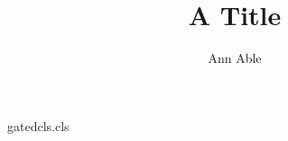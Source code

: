 \begin{filecontents*}[force]{gatedcls.cls}
\newcount\aucount
\def\author#1{\advance\aucount by 1 \gdef\@author{#1}}
\def\auaddress{}
\newcommand{\address}[1]{\g@addto@macro\auaddress{#1\par}}
\renewcommand\maketitle{\par{\@title\par}\ifnum\aucount>0 {\@author\par}{\auaddress}\fi}
\end{filecontents*}
\documentclass{gatedcls}
\title{A Title}\author{Ann Able}
\address{Lunar Institute, Gravel Road}
\maketitle
Body text.


